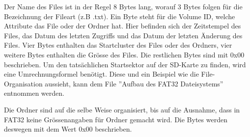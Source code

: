 Der Name des Files ist in der Regel 8 Bytes lang, worauf 3 Bytes folgen für die Bezeichnung der Fileart (z.B .txt). Ein Byte steht für die Volume ID, welche Attribute das File oder der Ordner hat. Hier befinden sich der Zeitstempel des Files, das Datum des letzten Zugriffs und das Datum der letzten Änderung des Files. Vier Bytes enthalten das Startcluster des Files oder des Ordners, vier weitere Bytes enthalten die Grösse des Files. Die restlichen Bytes sind mit 0x00 beschrieben. Um den tatsächlichen Startsektor auf der SD-Karte zu finden, wird eine Umrechnungsformel benötigt. Diese und ein Beispiel wie die File-Organisation aussieht, kann dem File ''Aufbau des FAT32 Dateisystems'' entnommen werden.


Die Ordner sind auf die selbe Weise organisiert, bis auf die Ausnahme, dass in FAT32 keine Grössenangaben für Ordner gemacht wird. Die Bytes werden deswegen mit dem Wert 0x00 beschrieben.